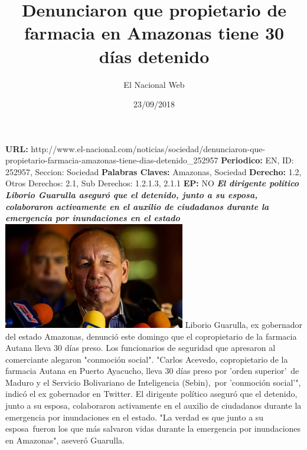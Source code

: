 \documentclass{article}%
\title{\textbf{Denunciaron que propietario de farmacia en Amazonas tiene 30 días detenido}}%
\author{El Nacional Web}%
\date{23/09/2018}%
\begin{document}
%
\normalsize%
\maketitle%
\textbf{URL: }%
http://www.el{-}nacional.com/noticias/sociedad/denunciaron{-}que{-}propietario{-}farmacia{-}amazonas{-}tiene{-}dias{-}detenido\_252957\newline%
%
\textbf{Periodico: }%
EN, %
ID: %
252957, %
Seccion: %
Sociedad\newline%
%
\textbf{Palabras Claves: }%
Amazonas, Sociedad\newline%
%
\textbf{Derecho: }%
1.2, %
Otros Derechos: %
2.1, %
Sub Derechos: %
1.2.1.3, 2.1.1\newline%
%
\textbf{EP: }%
NO\newline%
\newline%
%
\textbf{\textit{El dirigente político Liborio Guarulla aseguró que el detenido, junto a su esposa, colaboraron activamente en el auxilio de ciudadanos durante la emergencia por inundaciones en el estado}}%
\newline%
\newline%
%
\includegraphics[width=300px]{145.jpg}%
\newline%
%
Liborio Guarulla, ex gobernador del estado Amazonas, denunció este domingo que el copropietario de la farmacia Autana lleva 30 días preso. Los funcionarios de seguridad que apresaron al comerciante alegaron "conmoción social".%
\newline%
%
"Carlos Acevedo, copropietario de la farmacia Autana en Puerto Ayacucho, lleva 30 días preso por 'orden superior'~de Maduro y el Servicio Bolivariano de Inteligencia (Sebin),~por 'conmoción social'", indicó el ex gobernador en Twitter.%
\newline%
%
El dirigente político aseguró que el detenido, junto a su esposa, colaboraron activamente en el auxilio de ciudadanos durante la emergencia por inundaciones en el estado.%
\newline%
%
"La verdad es que junto a su esposa~fueron los que más salvaron vidas durante la emergencia por inundaciones en Amazonas", aseveró Guarulla.%
\newline%
%
\end{document}
